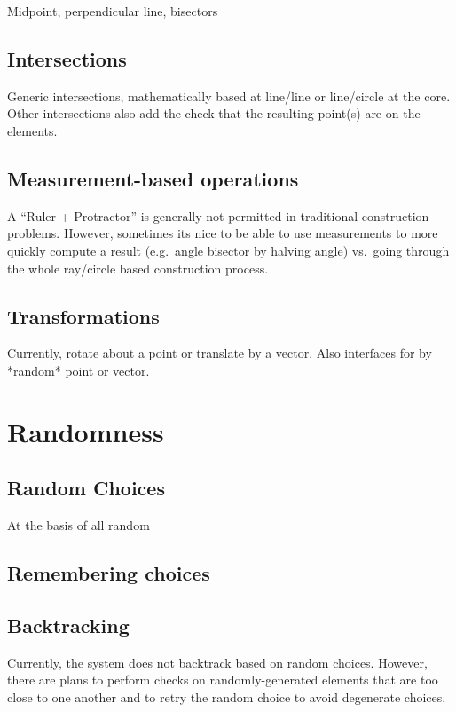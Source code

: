 Midpoint, perpendicular line, bisectors

\subsection{Intersections}

Generic intersections, mathematically based at line/line or
line/circle at the core. Other intersections also add the check that
the resulting point(s) are on the elements.

\subsection{Measurement-based operations}

A ``Ruler + Protractor'' is generally not permitted in traditional
construction problems. However, sometimes its nice to be able to use
measurements to more quickly compute a result (e.g.\ angle bisector by
halving angle) vs.\ going through the whole ray/circle based
construction process.

\subsection{Transformations}

Currently, rotate about a point or translate by a vector. Also
interfaces for by *random* point or vector.

\section{Randomness}

\subsection{Random Choices}

At the basis of all random

\subsection{Remembering choices}

\subsection{Backtracking}

Currently, the system does not backtrack based on random
choices. However, there are plans to perform checks on
randomly-generated elements that are too close to one another and to
retry the random choice to avoid degenerate choices.

